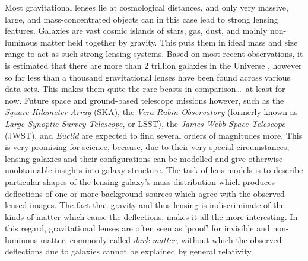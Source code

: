 Most gravitational lenses lie at cosmological distances, and only very massive,
large, and mass-concentrated objects can in this case lead to strong lensing
features.  Galaxies are vast cosmic islands of stars, gas, dust, and mainly
non-luminous matter held together by gravity.  This puts them in ideal mass and
size range to act as such strong-lensing systems.  Based on most recent
observations, it is estimated that there are more than 2 trillion galaxies in
the Universe , however so far less than a thousand
gravitational lenses have been found across various data sets.  This makes them
quite the rare beasts in comparison\dots\ at least for now.  Future space and
ground-based telescope missions however, such as the \textit{Square Kilometer
Array} (SKA), the \textit{Vera Rubin Observatory} (formerly known as
\textit{Large Synoptic Survey Telescope}, or LSST), the \textit{James Webb Space
Telescope} (JWST), and \textit{Euclid} are expected to find several orders of
magnitudes more.  This is very promising for science, because, due to their very
special circumstances, lensing galaxies and their configurations can be modelled
and give otherwise unobtainable insights into galaxy structure. The task of lens
models is to describe particular shapes of the lensing galaxy's mass
distribution which produces deflections of one or more background sources which
agree with the observed lensed images.  The fact that gravity and thus lensing
is indiscriminate of the kinds of matter which cause the deflections, makes it
all the more interesting.  In this regard, gravitational lenses are often seen
as 'proof' for
invisible and non-luminous matter, commonly called \textit{dark matter}, without
which the observed deflections due to galaxies cannot be explained by general
relativity.

